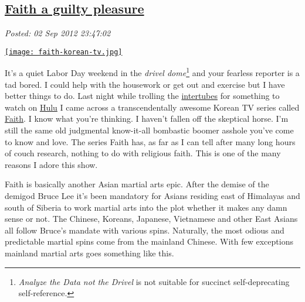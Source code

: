 %

\subsection*{\href{http://bakerjd99.wordpress.com/2012/09/02/faith-a-guilty-pleasure/}{Faith a guilty pleasure}}


\noindent\emph{Posted: 02 Sep 2012 23:47:02}
\vspace{6pt}


\captionsetup[floatingfigure]{labelformat=empty}
\begin{floatingfigure}[l]{0.25\textwidth}
\centering
\href{http://www.squidoo.com/faith-korean-drama}{\texttt{[image: faith-korean-tv.jpg]}}
\label{fig:3163X0}
\end{floatingfigure}It's
a quiet Labor Day weekend in the \emph{drivel dome}\footnote{
\emph{Analyze the Data not the Drivel} is not
suitable for succinct self-deprecating self-reference.
}
and your fearless reporter is a tad bored. I could help with the
housework or get out and exercise but I have better things to do. Last
night while trolling the
\href{http://www.urbandictionary.com/define.php?term=intertubes}{intertubes}
for something to watch on \href{http://www.hulu.com/}{Hulu} I came
across a transcendentally awesome Korean TV series called
\href{http://www.hulu.com/search?q=faith}{Faith}. I know what you're
thinking. I haven't fallen off the skeptical horse. I'm still the same
old judgmental know-it-all bombastic boomer asshole you've come to know
and love. The series Faith has, as far as I can tell after many long
hours of couch research, nothing to do with religious faith. This is one
of the many reasons I adore this show.

Faith is basically another Asian martial arts epic. After the demise of
the demigod Bruce Lee it's been mandatory for Asians residing east of
Himalayas and south of Siberia to work martial arts into the plot
whether it makes any damn sense or not. The Chinese, Koreans, Japanese,
Vietnamese and other East Asians all follow Bruce's mandate with various
spins. Naturally, the most odious and predictable martial spins come
from the mainland Chinese. With few exceptions mainland martial arts
goes something like this.

